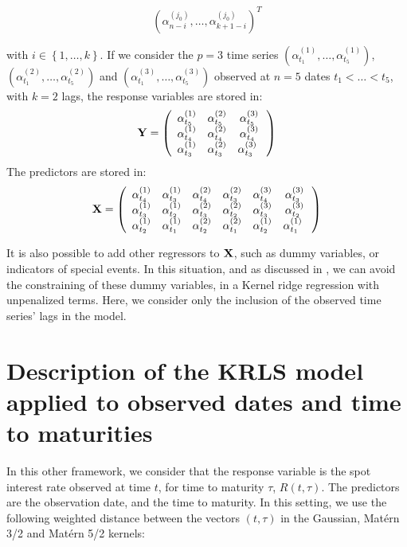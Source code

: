 \begin{equation}
\left( \alpha^{(j_0)}_{n-i}, \ldots, \alpha^{(j_0)}_{k+1-i} \right)^T
\end{equation}

with $i \in
\left\lbrace 1, \ldots, k \right\rbrace$. If we consider the $p = 3$ time series $(\alpha^{(1)}_{t_1}, \ldots,  \alpha^{(1)}_{t_5})$, $(\alpha^{(2)}_{t_1}, \ldots,  \alpha^{(2)}_{t_5})$ and $(\alpha^{(3)}_{t_1}, \ldots,  \alpha^{(3)}_{t_5})$ observed at $n = 5$ dates $t_1 < \ldots < t_5$, with $k = 2$ lags,  the response variables are stored in:
$$
{\bf Y} = \left( {\begin{array}{ccc} \alpha^{(1)}_{t_5} &  \alpha^{(2)}_{t_5} &  \alpha^{(3)}_{t_5}\\ \alpha^{(1)}_{t_4} & \alpha^{(2)}_{t_4} & \alpha^{(3)}_{t_4} \\ \alpha^{(1)}_{t_3} & \alpha^{(2)}_{t_3} & \alpha^{(3)}_{t_3}\      \end{array} } \right)
$$
The predictors are stored in:
$$
{\bf X} = \left( {\begin{array}{cccccc} \alpha^{(1)}_{t_4} & \alpha^{(1)}_{t_3} & \alpha^{(2)}_{t_4} & \alpha^{(2)}_{t_3} & \alpha^{(3)}_{t_4} & \alpha^{(3)}_{t_3} \\ \alpha^{(1)}_{t_3} & \alpha^{(1)}_{t_2} & \alpha^{(2)}_{t_3} & \alpha^{(2)}_{t_2} & \alpha^{(3)}_{t_3} & \alpha^{(3)}_{t_2} \\ \alpha^{(1)}_{t_2} & \alpha^{(1)}_{t_1} & \alpha^{(2)}_{t_2} & \alpha^{(2)}_{t_1} & \alpha^{(1)}_{t_2} & \alpha^{(1)}_{t_1} \      \end{array} }\right)
$$


It is also possible to add other regressors to ${\bf X}$, such as dummy variables, or indicators of special events. In this situation, and as discussed in \cite{exterkate2016nonlinear}, we can avoid the constraining of these dummy variables, in a Kernel ridge regression with unpenalized terms. Here, we consider only the inclusion of the observed time series' lags in the model.

\section{Description of the KRLS model applied to observed dates and time to maturities}
\label{sec:krls}

In this other framework, we consider that the response variable is the spot interest rate observed at time $t$, for time to maturity $\tau$, $R(t, \tau)$. The predictors are the observation date, and the time to maturity. In this setting, we use the following weighted distance between the vectors $(t, \tau)$ in the Gaussian, Mat\'ern 3/2 and Mat\'ern 5/2 kernels:


